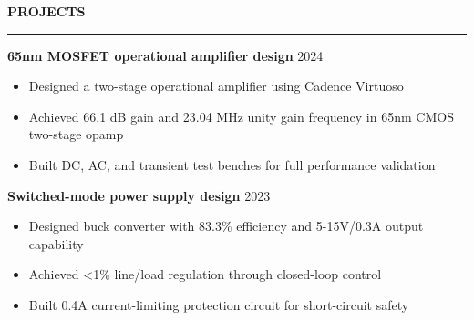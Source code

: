 \documentclass[notitlepage,10pt,a4paper]{article}
\newenvironment{resumesection}[1]{
    \header{#1}
}{}
\newcommand{\header}[1]{
    \vspace{2pt}
    \textcolor{accent1}{\Large \textbf{#1}}
    \vspace{6pt}\hrule\vspace{4pt}
}
\newcommand{\TECH}{
    \textcolor{accent3}{\small\textbf{SKILLS}}\small\,
}
\newcommand{\thingsep}{
    \vspace{4pt}
}
\begin{document}
\begin{resumesection}{PROJECTS}


    \raggedright
    \textcolor{accent2}{\textbf{\large 65nm MOSFET operational amplifier design}} \hfill {2024} \
    {\small\begin{itemize}[noitemsep, font=\small, label={-}, leftmargin=*, topsep=0pt, partopsep=0pt]
        \item Designed a two-stage operational amplifier using Cadence Virtuoso
        \item Achieved 66.1 dB gain and 23.04 MHz unity gain frequency in 65nm CMOS two-stage opamp
        \item Built DC, AC, and transient test benches for full performance validation
    \end{itemize}}
    \thingsep

    \raggedright
    \textcolor{accent2}{\textbf{\large Switched-mode power supply design}} \hfill {2023} \\
    {\small\begin{itemize}[noitemsep, font=\small, label={-}, leftmargin=*, topsep=0pt, partopsep=0pt]
        \item Designed buck converter with 83.3\% efficiency and 5-15V/0.3A output capability
        \item Achieved <1\% line/load regulation through closed-loop control
        \item Built 0.4A current-limiting protection circuit for short-circuit safety
    \end{itemize}}
    \thingsep


\end{resumesection}
\end{document}
